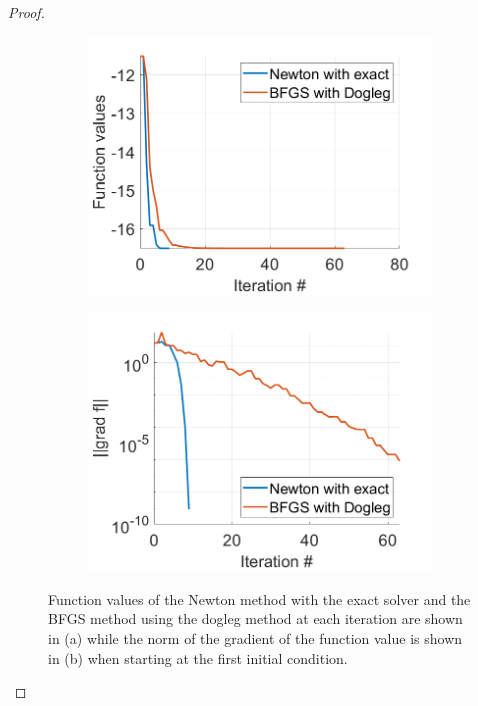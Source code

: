 \documentclass[12pt]{report}
\begin{document}
\begin{problem}
\begin{proof}
\begin{figure}[H]
    \begin{subfigure}[b]{0.5\linewidth}
        \centering
        \includegraphics[width=\linewidth]{images/3-1-fun.png}
        \caption{}
        \label{fig4:a}
        \vspace{4ex}
    \end{subfigure}%
    \begin{subfigure}[b]{0.5\linewidth}
        \centering
        \includegraphics[width=\linewidth]{images/3-1-grad.png}
        \caption{}
        \label{fig4:b}
        \vspace{4ex}
    \end{subfigure}
    \caption{Function values of the Newton method with the exact solver and the BFGS method using the dogleg method at each iteration are shown in (a) while the norm of the gradient of the function value is shown in (b) when starting at the first initial condition.}

\end{figure}
\end{proof}
\end{problem}
\end{document}

